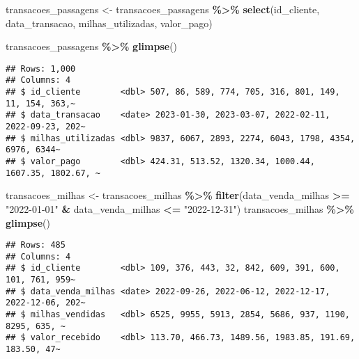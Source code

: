 \documentclass[
]{article}
\newenvironment{Shaded}{\begin{snugshade}}{\end{snugshade}}
\newcommand{\FunctionTok}[1]{\textcolor[rgb]{0.13,0.29,0.53}{\textbf{#1}}}
\newcommand{\NormalTok}[1]{#1}
\newcommand{\OtherTok}[1]{\textcolor[rgb]{0.56,0.35,0.01}{#1}}
\newcommand{\SpecialCharTok}[1]{\textcolor[rgb]{0.81,0.36,0.00}{\textbf{#1}}}
\newcommand{\StringTok}[1]{\textcolor[rgb]{0.31,0.60,0.02}{#1}}
\begin{document}
\begin{Shaded}
\begin{Highlighting}[]
\NormalTok{transacoes\_passagens }\OtherTok{\textless{}{-}}\NormalTok{ transacoes\_passagens }\SpecialCharTok{\%\textgreater{}\%} \FunctionTok{select}\NormalTok{(id\_cliente, data\_transacao, milhas\_utilizadas, valor\_pago)}
\end{Highlighting}
\end{Shaded}

\begin{Shaded}
\begin{Highlighting}[]
\NormalTok{transacoes\_passagens }\SpecialCharTok{\%\textgreater{}\%} \FunctionTok{glimpse}\NormalTok{()}
\end{Highlighting}
\end{Shaded}

\begin{verbatim}
## Rows: 1,000
## Columns: 4
## $ id_cliente        <dbl> 507, 86, 589, 774, 705, 316, 801, 149, 11, 154, 363,~
## $ data_transacao    <date> 2023-01-30, 2023-03-07, 2022-02-11, 2022-09-23, 202~
## $ milhas_utilizadas <dbl> 9837, 6067, 2893, 2274, 6043, 1798, 4354, 6976, 6344~
## $ valor_pago        <dbl> 424.31, 513.52, 1320.34, 1000.44, 1607.35, 1802.67, ~
\end{verbatim}

\begin{Shaded}
\begin{Highlighting}[]
\NormalTok{transacoes\_milhas }\OtherTok{\textless{}{-}}\NormalTok{ transacoes\_milhas }\SpecialCharTok{\%\textgreater{}\%} \FunctionTok{filter}\NormalTok{(data\_venda\_milhas }\SpecialCharTok{\textgreater{}=} \StringTok{"2022{-}01{-}01"} \SpecialCharTok{\&}\NormalTok{ data\_venda\_milhas }\SpecialCharTok{\textless{}=} \StringTok{"2022{-}12{-}31"}\NormalTok{)}
\NormalTok{transacoes\_milhas }\SpecialCharTok{\%\textgreater{}\%} \FunctionTok{glimpse}\NormalTok{()}
\end{Highlighting}
\end{Shaded}

\begin{verbatim}
## Rows: 485
## Columns: 4
## $ id_cliente        <dbl> 109, 376, 443, 32, 842, 609, 391, 600, 101, 761, 959~
## $ data_venda_milhas <date> 2022-09-26, 2022-06-12, 2022-12-17, 2022-12-06, 202~
## $ milhas_vendidas   <dbl> 6525, 9955, 5913, 2854, 5686, 937, 1190, 8295, 635, ~
## $ valor_recebido    <dbl> 113.70, 466.73, 1489.56, 1983.85, 191.69, 183.50, 47~
\end{verbatim}
\end{document}
